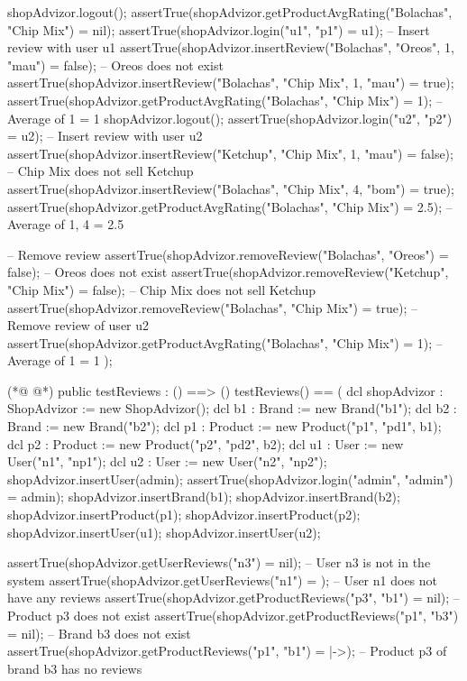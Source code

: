 \begin{vdmpp}[breaklines=true]
   shopAdvizor.logout();
   assertTrue(shopAdvizor.getProductAvgRating("Bolachas", "Chip Mix") = nil);
  assertTrue(shopAdvizor.login("u1", "p1") = u1); -- Insert review with user u1
   assertTrue(shopAdvizor.insertReview("Bolachas", "Oreos", 1, "mau") = false); -- Oreos does not exist
   assertTrue(shopAdvizor.insertReview("Bolachas", "Chip Mix", 1, "mau") = true);
   assertTrue(shopAdvizor.getProductAvgRating("Bolachas", "Chip Mix") = 1); -- Average of {1} = 1
   shopAdvizor.logout();
   assertTrue(shopAdvizor.login("u2", "p2") = u2); -- Insert review with user u2
   assertTrue(shopAdvizor.insertReview("Ketchup", "Chip Mix", 1, "mau") = false); -- Chip Mix does not sell Ketchup
   assertTrue(shopAdvizor.insertReview("Bolachas", "Chip Mix", 4, "bom") = true);
   assertTrue(shopAdvizor.getProductAvgRating("Bolachas", "Chip Mix") = 2.5); -- Average of {1, 4} = 2.5
   
   -- Remove review
   assertTrue(shopAdvizor.removeReview("Bolachas", "Oreos") = false); -- Oreos does not exist
   assertTrue(shopAdvizor.removeReview("Ketchup", "Chip Mix") = false); -- Chip Mix does not sell Ketchup
   assertTrue(shopAdvizor.removeReview("Bolachas", "Chip Mix") = true); -- Remove review of user u2
   assertTrue(shopAdvizor.getProductAvgRating("Bolachas", "Chip Mix") = 1); -- Average of {1} = 1
  );
  
(*@
\label{testReviews:77}
@*)
  public testReviews : () ==> ()
  testReviews() == 
  (
   dcl shopAdvizor : ShopAdvizor := new ShopAdvizor();
   dcl b1 : Brand := new Brand("b1");
   dcl b2 : Brand := new Brand("b2");
  dcl p1 : Product := new Product("p1", "pd1", b1);
  dcl p2 : Product := new Product("p2", "pd2", b2);
  dcl u1 : User := new User("n1", "np1");
  dcl u2 : User := new User("n2", "np2");
  shopAdvizor.insertUser(admin);
  assertTrue(shopAdvizor.login("admin", "admin") = admin);
  shopAdvizor.insertBrand(b1);
  shopAdvizor.insertBrand(b2);
  shopAdvizor.insertProduct(p1);
  shopAdvizor.insertProduct(p2);
  shopAdvizor.insertUser(u1);
  shopAdvizor.insertUser(u2);
  
  assertTrue(shopAdvizor.getUserReviews("n3") = nil); -- User n3 is not in the system
  assertTrue(shopAdvizor.getUserReviews("n1") = {}); -- User n1 does not have any reviews
  assertTrue(shopAdvizor.getProductReviews("p3", "b1") = nil); -- Product p3 does not exist
  assertTrue(shopAdvizor.getProductReviews("p1", "b3") = nil); -- Brand b3 does not exist
  assertTrue(shopAdvizor.getProductReviews("p1", "b1") = {|->}); -- Product p3 of brand b3 has no reviews
  

\end{vdmpp}
